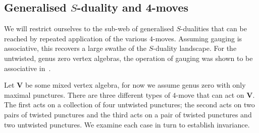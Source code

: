 \documentclass[a4paper]{article}
\def\V{\mathbf{V}}
\begin{document}
\subsection{\label{ssec:duality}Generalised \texorpdfstring{$S$}{S}-duality and 4-moves}

We will restrict ourselves to the sub-web of generalised $S$-dualities that can be reached by repeated application of the various $4$-moves. Assuming gauging is associative, this recovers a large swathe of the $S$-duality landscape. For the untwisted, genus zero vertex algebras, the operation of gauging was shown to be associative in~\cite{Arakawa:2018egx}.

Let $\V$ be some mixed vertex algebra, for now we assume genus zero with only maximal punctures. There are three different types of $4$-move that can act on $\V$. The first acts on a collection of four untwisted punctures; the second acts on two pairs of twisted punctures and the third acts on a pair of twisted punctures and two untwisted punctures. We examine each case in turn to establish invariance.
\end{document}

